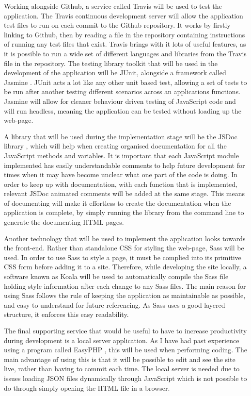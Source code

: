 Working alongside Github, a service called Travis \cite{travis} will be used to test the application. The Travis continuous development server will allow the application test files to run on each commit to the Github repository. It works by firstly linking to Github, then by reading a file in the repository containing instructions of running any test files that exist. Travis brings with it lots of useful features, as it is possible to run a wide set of different languages and libraries from the Travis file in the repository. The testing library toolkit that will be used in the development of the application will be JUnit, alongside a framework called Jasmine \cite{jasmine}. JUnit acts a lot like any other unit based test, allowing a set of tests to be run after another testing different scenarios across an applications functions. Jasmine will allow for cleaner behaviour driven testing of JavaScript code and will run headless, meaning the application can be tested without loading up the web-page.

A library that will be used during the implementation stage will be the JSDoc library \cite{jsdoc}, which will help when creating organised documentation for all the JavaScript methods and variables. It is important that each JavaScript module implemented has easily understandable comments to help future development for times when it may have become unclear what one part of the code is doing. In order to keep up with documentation, with each function that is implemented, relevant JSDoc animated comments will be added at the same stage. This means of documenting will make it effortless to create the documentation when the application is complete, by simply running the library from the command line to generate the documenting HTML pages.

Another technology that will be used to implement the application looks towards the front-end. Rather than standalone CSS for styling the web-page, Sass \cite{sass} will be used. In order to use Sass to style a page, it must be complied into its primitive CSS form before adding it to a site. Therefore, while developing the site locally, a software known as Koala \cite{koala} will be used to automatically compile the Sass file holding style information after each change to any Sass files. The main reason for using Sass follows the rule of keeping the application as maintainable as possible, and easy to understand for future referencing. As Sass uses a good layered structure, it enforces this easy readability.

The final supporting service that would be useful to have to increase productivity during development is a local server application. As I have had past experience using a program called EasyPHP \cite{easyphp}, this will be used when performing coding. The main advantage of using this is that it will be possible to edit and see the site live, rather than having to commit each time. The local server is needed due to issues loading JSON files dynamically through JavaScript which is not possible to do through simply opening the HTML file in a browser.
